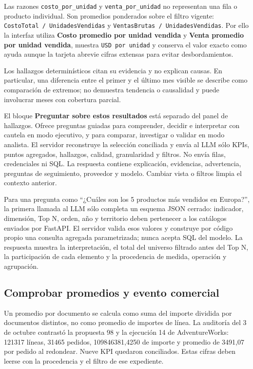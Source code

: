 \documentclass[11pt,letterpaper]{article}
\newcommand{\file}[1]{\texttt{#1}}
\begin{document}
Las razones \file{costo\_por\_unidad} y \file{venta\_por\_unidad} no representan una fila o producto individual. Son promedios ponderados sobre el filtro vigente: \file{CostoTotal / UnidadesVendidas} y \file{VentasBrutas / UnidadesVendidas}. Por ello la interfaz utiliza \textbf{Costo promedio por unidad vendida} y \textbf{Venta promedio por unidad vendida}, muestra \file{USD por unidad} y conserva el valor exacto como ayuda aunque la tarjeta abrevie cifras extensas para evitar desbordamientos.

Los hallazgos determinísticos citan su evidencia y no explican causas. En particular, una diferencia entre el primer y el último mes visible se describe como comparación de extremos; no demuestra tendencia o causalidad y puede involucrar meses con cobertura parcial.

El bloque \textbf{Preguntar sobre estos resultados} está separado del panel de hallazgos. Ofrece preguntas guiadas para comprender, decidir e interpretar con cautela en modo ejecutivo, y para comparar, investigar o validar en modo analista. El servidor reconstruye la selección conciliada y envía al LLM sólo KPIs, puntos agregados, hallazgos, calidad, granularidad y filtros. No envía filas, credenciales ni SQL. La respuesta contiene explicación, evidencias, advertencia, preguntas de seguimiento, proveedor y modelo. Cambiar vista o filtros limpia el contexto anterior.

Para una pregunta como ``¿Cuáles son los 5 productos más vendidos en Europa?'', la primera llamada al LLM sólo completa un esquema JSON cerrado: indicador, dimensión, Top N, orden, año y territorio deben pertenecer a los catálogos enviados por FastAPI. El servidor valida esos valores y construye por código propio una consulta agregada parametrizada; nunca acepta SQL del modelo. La respuesta muestra la interpretación, el total del universo filtrado antes del Top N, la participación de cada elemento y la procedencia de medida, operación y agrupación.

\subsection{Comprobar promedios y evento comercial}

Un promedio por documento se calcula como suma del importe dividida por documentos
distintos, no como promedio de importes de línea. La auditoría del 3 de octubre contrastó
la propuesta 98 y la ejecución 14 de AdventureWorks: 121317 líneas, 31465 pedidos,
109846381,4250 de importe y promedio de 3491,07 por pedido al redondear. Nueve KPI quedaron
conciliados. Estas cifras deben leerse con la procedencia y el filtro de ese expediente.
\end{document}
